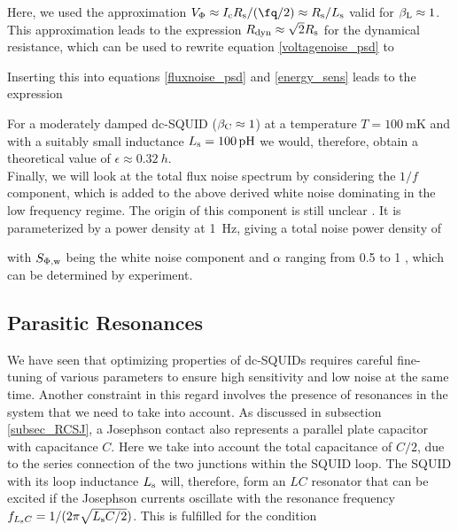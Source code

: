 
Here, we used the approximation $V_{\rm \Phi}\approx I_{\rm c}R_{\rm s}/(\unit{\fq}/2)\approx R_{\rm s}/L_{\rm s}$ valid for $\beta_{\rm L}\approx 1$. This approximation leads to the expression $R_{\rm dyn}\approx \sqrt{2}R_{\rm s}$ for the dynamical resistance, which can be used to rewrite equation \ref{voltagenoise_psd} to 


Inserting this into equations \ref{fluxnoise_psd} and \ref{energy_sens} leads to the expression


For a moderately damped dc-SQUID ($\beta_{\rm C}\approx 1$) at a temperature $T=\qty{100}{\milli\kelvin}$ and with a suitably small inductance $L_{\rm s}=\qty{100}{\pico\henry}$ we would, therefore, obtain a theoretical value of $\epsilon\approx \qty{0.32}{h}$. \\

Finally, we will look at the total flux noise spectrum by considering the $1/f$ component, which is added to the above derived white noise dominating in the low frequency regime. The origin of this component is still unclear \cite{Kempf2016}. It is parameterized by a power density at \qty{1}{\hertz}, giving a total noise power density of      



with $S_{\rm \Phi,w}$ being the white noise component and $\alpha$ ranging from 0.5 to 1 \cite{Drung2011}, which can be determined by experiment.

\subsection{Parasitic Resonances}\label{subsec_para_res}

We have seen that optimizing properties of dc-SQUIDs requires careful fine-tuning of various parameters to ensure high sensitivity and low noise at the same time. Another constraint in this regard involves the presence of resonances in the system that we need to take into account. As discussed in subsection \ref{subsec_RCSJ}, a Josephson contact also represents a parallel plate capacitor with capacitance $C$. Here we take into account the total capacitance of $C/2$, due to the series connection of the two junctions within the SQUID loop. The SQUID with its loop inductance $L_{\rm s}$ will, therefore, form an $LC$ resonator that can be excited if the Josephson currents oscillate with the resonance frequency $f_{L_{\rm s}C}={1}/({2\pi\sqrt{L_{\rm s}C/2}})$. This is fulfilled for the condition 

